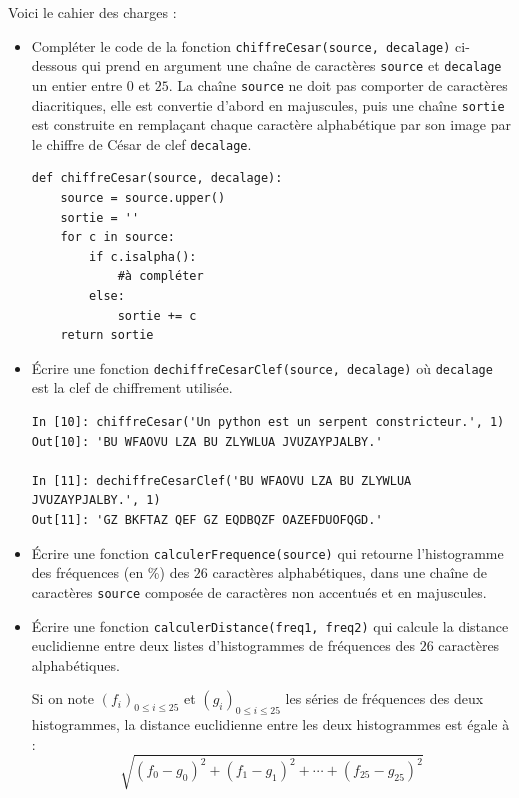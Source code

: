 \documentclass[a4paper, french, 12pt]{article}  %
\newcounter{act}
\newcounter{def}
\begin{document}
Voici le cahier des charges :

\begin{itemize}[label=]

	\item Compléter le code de la fonction \texttt{chiffreCesar(source, decalage)} ci-dessous qui prend en argument une chaîne de caractères \texttt{source} et  \texttt{decalage}  un entier entre $0$ et $25$. La chaîne \texttt{source} ne doit pas comporter de caractères diacritiques, elle est convertie d'abord  en majuscules, puis une chaîne  \texttt{sortie} est construite en remplaçant chaque caractère alphabétique par son image par le chiffre de César de clef \texttt{decalage}. 
	
\begin{lstlisting}
def chiffreCesar(source, decalage):
	source = source.upper()
    sortie = ''
    for c in source:
        if c.isalpha():
            #à compléter
        else:
            sortie += c
    return sortie
\end{lstlisting}

\item Écrire une fonction \texttt{dechiffreCesarClef(source, decalage)} où \texttt{decalage} est la clef de chiffrement utilisée.

\begin{lstlisting}
In [10]: chiffreCesar('Un python est un serpent constricteur.', 1)
Out[10]: 'BU WFAOVU LZA BU ZLYWLUA JVUZAYPJALBY.'

In [11]: dechiffreCesarClef('BU WFAOVU LZA BU ZLYWLUA JVUZAYPJALBY.', 1)
Out[11]: 'GZ BKFTAZ QEF GZ EQDBQZF OAZEFDUOFQGD.'
\end{lstlisting}

\item Écrire une fonction \texttt{calculerFrequence(source)} qui retourne l'histogramme des fréquences (en \%) des $26$ caractères alphabétiques,  dans une chaîne de caractères \texttt{source} composée de caractères non accentués et en majuscules.

\item Écrire une fonction \texttt{calculerDistance(freq1, freq2)} qui calcule la distance euclidienne entre deux listes d'histogrammes de fréquences des  $26$ caractères alphabétiques.

Si on note $\left( f_{i} \right)_{0 \leqslant i \leqslant 25}$ et $\left( g_{i} \right)_{0 \leqslant i \leqslant 25}$ les séries de fréquences des deux histogrammes, la distance euclidienne entre les deux histogrammes est égale à :
\begin{equation*}
\sqrt{\left(f_{0} - g_{0}  \right)^{2} + \left(f_{1} - g_{1}  \right)^{2} + \cdots + \left(f_{25} - g_{25}  \right)^{2}}
\end{equation*}



\end{itemize}
\end{document}
